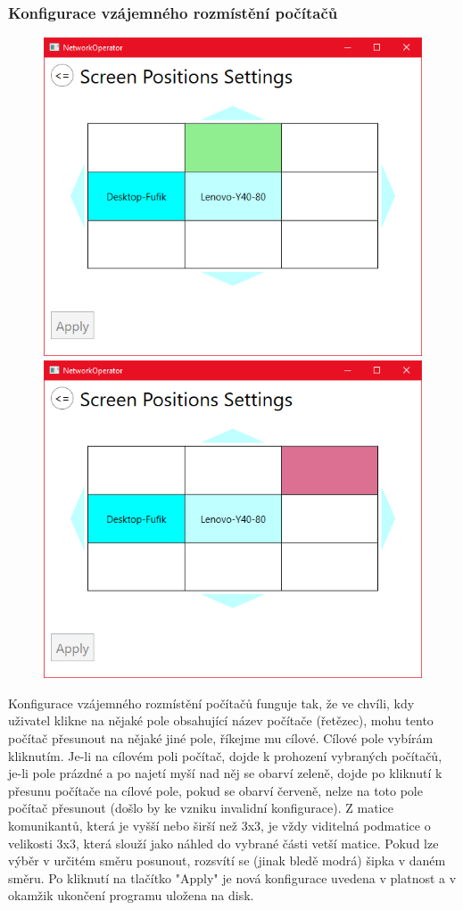 \documentclass[12pt]{article}
\begin{document}
\subsubsection{Konfigurace vzájemného rozmístění počítačů}
\begin{figure}[H]
\includegraphics[width=12cm]{screen-positions-settings-green-field.png}
\includegraphics[width=12cm]{screen-positions-settings-red-field.png}
\centering
\end{figure}

Konfigurace vzájemného rozmístění počítačů funguje tak, že ve chvíli, kdy uživatel klikne na nějaké pole obsahující název počítače (řetězec), mohu tento počítač přesunout na nějaké jiné pole, říkejme mu cílové. Cílové pole vybírám kliknutím. Je-li na cílovém poli počítač, dojde k prohození vybraných počítačů, je-li pole prázdné a po najetí myší nad něj se obarví zeleně, dojde po kliknutí k přesunu počítače na cílové pole, pokud se obarví červeně, nelze na toto pole počítač přesunout (došlo by ke vzniku invalidní konfigurace). Z matice komunikantů, která je vyšší nebo širší než 3x3, je vždy viditelná podmatice o velikosti 3x3, která slouží jako náhled do vybrané části vetší matice. Pokud lze výběr v určitém směru posunout, rozsvítí se (jinak bledě modrá) šipka v daném směru. Po kliknutí na tlačítko "Apply" je nová konfigurace uvedena v platnost a v okamžik ukončení programu uložena na disk.
\end{document}
